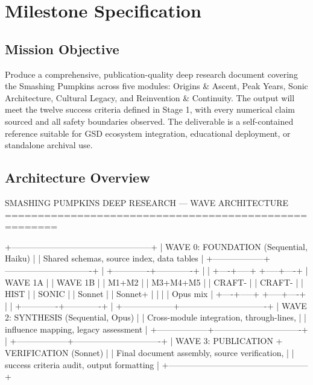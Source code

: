 \documentclass[11pt,letterpaper]{article}
\newcommand{\stageheader}[2]{%
  \noindent\colorbox{#2}{\makebox[\textwidth][l]{%
    \textcolor{white}{\bfseries\sffamily\hspace{6pt}#1\hspace{6pt}}}}%
  \vspace{0.5em}\par%
}
\begin{document}
\stageheader{STAGE 3 --- MISSION PACKAGE}{tertiary}

\section{Milestone Specification}

\subsection{Mission Objective}

Produce a comprehensive, publication-quality deep research document covering the Smashing Pumpkins across five modules: Origins \& Ascent, Peak Years, Sonic Architecture, Cultural Legacy, and Reinvention \& Continuity. The output will meet the twelve success criteria defined in Stage 1, with every numerical claim sourced and all safety boundaries observed. The deliverable is a self-contained reference suitable for GSD ecosystem integration, educational deployment, or standalone archival use.

\subsection{Architecture Overview}

\begin{asciibox}
SMASHING PUMPKINS DEEP RESEARCH --- WAVE ARCHITECTURE
======================================================

    +--------------------------------------------------+
    | WAVE 0: FOUNDATION (Sequential, Haiku)           |
    | Shared schemas, source index, data tables        |
    +------------------+-------------------------------+
                       |
         +-------------+-------------+
         |                           |
    +----+-----+               +-----+----+
    | WAVE 1A  |               | WAVE 1B  |
    | M1+M2    |               | M3+M4+M5 |
    | CRAFT-   |               | CRAFT-   |
    | HIST     |               | SONIC    |
    | Sonnet   |               | Sonnet+  |
    |          |               | Opus mix |
    +----+-----+               +-----+----+
         |                           |
         +-------------+-------------+
                       |
    +------------------+-------------------------------+
    | WAVE 2: SYNTHESIS (Sequential, Opus)             |
    | Cross-module integration, through-lines,         |
    | influence mapping, legacy assessment             |
    +------------------+-------------------------------+
                       |
    +------------------+-------------------------------+
    | WAVE 3: PUBLICATION + VERIFICATION (Sonnet)      |
    | Final document assembly, source verification,    |
    | success criteria audit, output formatting        |
    +--------------------------------------------------+
\end{asciibox}
\end{document}
